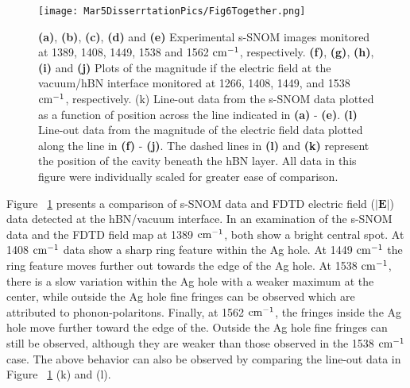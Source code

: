 \documentclass[
peprint,
amsmath,amssymb,
aip,
jap,
floatfix,
]{revtex4-2}
\begin{document}
      \begin{figure}[!htb]
        \centering\texttt{[image: Mar5DisserrtationPics/Fig6Together.png]}
        \caption{\textbf{(a)}, \textbf{(b)}, \textbf{(c)}, \textbf{(d)} and \textbf{(e)} Experimental s-SNOM images monitored at 1389, 1408, 1449, 1538 and 1562 $\rm cm^{-1}$, respectively. \textbf{(f)}, \textbf{(g)}, \textbf{(h)}, \textbf{(i)} and \textbf{(j)} Plots of the magnitude if the electric field at the vacuum/hBN interface monitored at 1266, 1408, 1449, and 1538 $\rm cm^{-1}$, respectively. (k) Line-out data from the s-SNOM data plotted as a function of position across the line indicated in \textbf{(a)} - \textbf{(e)}. \textbf{(l)}  Line-out data from the magnitude of the electric field data plotted along the line in \textbf{(f)} - \textbf{(j)}. The dashed lines in \textbf{(l)} and \textbf{(k)} represent the position of the cavity beneath the hBN layer. All data in this figure were individually scaled for greater ease of comparison.}
        \label{fig:6}
      \end{figure}

      Figure ~\ref{fig:6} presents a comparison of s-SNOM data and FDTD electric field ($|\textbf{E}|$) data detected at the hBN/vacuum interface. In an examination of the s-SNOM data and the FDTD field map at 1389 $\rm cm^{-1}$, both show a bright central spot. At 1408 $\rm cm^{-1}$ data show a sharp ring feature within the Ag hole. At 1449 $\rm cm^{-1}$ the ring feature moves further out towards the edge of the Ag hole. At 1538 $\rm cm^{-1}$, there is a slow variation within the Ag hole with a weaker maximum at the center, while outside the Ag hole fine fringes can be observed which are attributed to phonon-polaritons. Finally, at 1562 $\rm cm^{-1}$, the fringes inside the Ag hole move further toward the edge of the. Outside the Ag hole fine fringes can still be observed, although they are weaker than those observed in the 1538 $\rm cm^{-1}$ case. The above behavior can also be observed by comparing the line-out data in Figure ~\ref{fig:6} (k) and (l).
\end{document}
